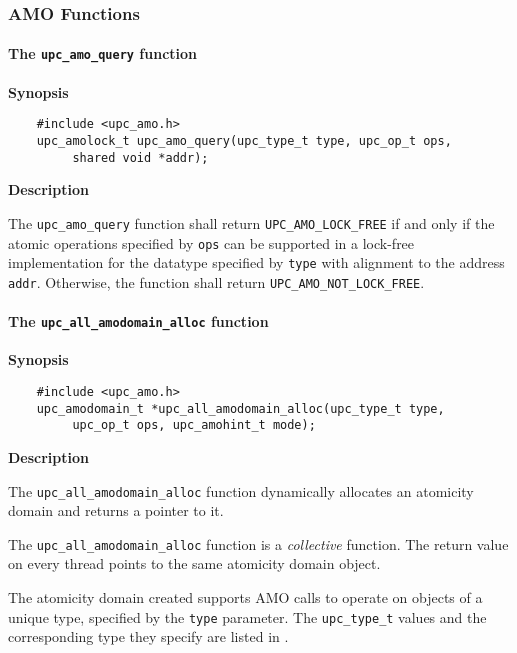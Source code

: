 \subsubsection{AMO Functions}
\label{upc-amo-functions}

\paragraph{The {\tt upc\_amo\_query} function}

{\bf Synopsis}

\npf\vspace{-1.8em}
\begin{verbatim}
    #include <upc_amo.h>
    upc_amolock_t upc_amo_query(upc_type_t type, upc_op_t ops,
         shared void *addr);
\end{verbatim}

{\bf Description}

\np The {\tt upc\_amo\_query} function shall return {\tt UPC\_AMO\_LOCK\_FREE}
    if and only if the atomic operations specified by {\tt ops} can be
    supported in a lock-free implementation for the datatype specified by
    {\tt type} with alignment to the address {\tt addr}.  Otherwise, the
    function shall return {\tt UPC\_AMO\_NOT\_LOCK\_FREE}.

\paragraph{The {\tt upc\_all\_amodomain\_alloc} function}

{\bf Synopsis}

\npf\vspace{-1.8em}
\begin{verbatim}
    #include <upc_amo.h>
    upc_amodomain_t *upc_all_amodomain_alloc(upc_type_t type,
         upc_op_t ops, upc_amohint_t mode);
\end{verbatim}

{\bf Description}

\np The {\tt upc\_all\_amodomain\_alloc} function dynamically allocates an
    atomicity domain and returns a pointer to it.

\np The {\tt upc\_all\_amodomain\_alloc} function is a {\em collective} function.
    The return value on every thread points to the same atomicity domain
    object.

\np The atomicity domain created supports AMO calls to operate on objects of a
    unique type, specified by the {\tt type} parameter.  The {\tt upc\_type\_t}
    values and the corresponding type they specify are listed in
    \upctypesection{}.

